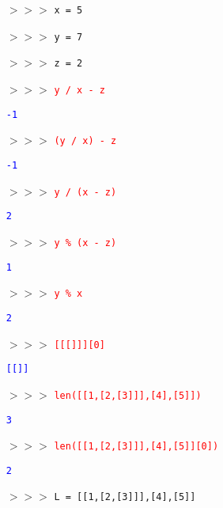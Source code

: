 \documentclass[11pt]{article}
\newcommand{\ans}[1]{\textcolor{red}{#1}}
\newcommand{\sol}[1]{\textcolor{blue}{#1}}
\begin{document}
\begin{itemize}
\item[$>>>$]\texttt{x = 5}
\item[$>>>$]\texttt{y = 7}
\item[$>>>$]\texttt{z = 2}
\item[$>>>$]\ans{\texttt{y / x - z}}
\item[] \sol{\texttt{-1}}
\item[$>>>$]\ans{\texttt{(y / x) - z}}
\item[] \sol{\texttt{-1}}
\item[$>>>$]\ans{\texttt{y / (x - z)}}
\item[] \sol{\texttt{2}}
\item[$>>>$]\ans{\texttt{y \% (x - z)}}
\item[] \sol{\texttt{1}}
\item[$>>>$]\ans{\texttt{y \% x}}
\item[] \sol{\texttt{2}}
\item[$>>>$]\ans{\texttt{[[[]]][0]}}
\item[] \sol{\texttt{[[]]}}
\item[$>>>$]\ans{\texttt{len([[1,[2,[3]]],[4],[5]])}}
\item[] \sol{\texttt{3}}
\item[$>>>$]\ans{\texttt{len([[1,[2,[3]]],[4],[5]][0])}}
\item[] \sol{\texttt{2}}
\item[$>>>$]\texttt{L = [[1,[2,[3]]],[4],[5]]}
\end{itemize}
\end{document}
